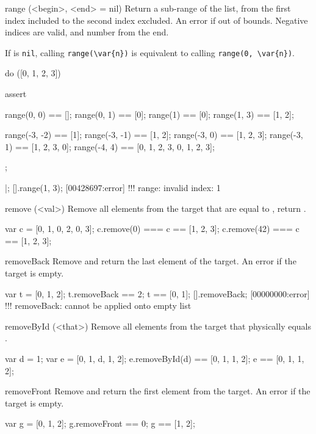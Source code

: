 \begin{urbiscriptapi}
\item[range](<begin>, <end> = nil)%
  Return a sub-range of the list, from the first index included to the
  second index excluded.  An error if out of bounds.  Negative indices
  are valid, and number from the end.

  If  is \lstinline|nil|, calling \lstinline|range(\var{n})|
  is equivalent to calling \lstinline|range(0, \var{n})|.

\begin{urbiscript}
do ([0, 1, 2, 3])
{
  assert
  {
    range(0, 0)   == [];
    range(0, 1)   == [0];
    range(1)      == [0];
    range(1, 3)   == [1, 2];

    range(-3, -2) == [1];
    range(-3, -1) == [1, 2];
    range(-3, 0)  == [1, 2, 3];
    range(-3, 1)  == [1, 2, 3, 0];
    range(-4, 4)  == [0, 1, 2, 3, 0, 1, 2, 3];
  };
}|;
[].range(1, 3);
[00428697:error] !!! range: invalid index: 1
\end{urbiscript}


\item[remove](<val>)%
  Remove all elements from the target that are equal to , return
  \this.

\begin{urbiassert}
var c = [0, 1, 0, 2, 0, 3];
c.remove(0)  === c ==  [1, 2, 3];
c.remove(42) === c ==  [1, 2, 3];
\end{urbiassert}


\item[removeBack]
  Remove and return the last element of the target. An error if the
  target is empty.

\begin{urbiassert}
var t = [0, 1, 2];
t.removeBack == 2;
t == [0, 1];
[].removeBack;
[00000000:error] !!! removeBack: cannot be applied onto empty list
\end{urbiassert}


\item[removeById](<that>)%
  Remove all elements from the target that physically equals
  .

\begin{urbiassert}
var d = 1;
var e = [0, 1, d, 1, 2];
e.removeById(d) == [0, 1, 1, 2];
e == [0, 1, 1, 2];
\end{urbiassert}


\item[removeFront] Remove and return the first element from the target. An
  error if the target is empty.

\begin{urbiassert}
var g = [0, 1, 2];
g.removeFront == 0;
g == [1, 2];


\end{urbiassert}
\end{urbiscriptapi}
